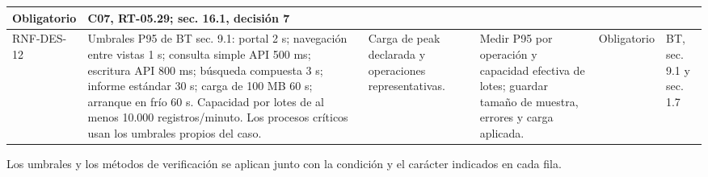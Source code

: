 \begin{longtable}{|L{0.096774\AnchoTablaAnexo}|L{0.298387\AnchoTablaAnexo}|L{0.133065\AnchoTablaAnexo}|L{0.233871\AnchoTablaAnexo}|L{0.076613\AnchoTablaAnexo}|L{0.161290\AnchoTablaAnexo}|}
Obligatorio &
C07, RT-05.29; sec. 16.1, decisión 7 \\ \hline
RNF-DES-12 &
Umbrales P95 de BT sec. 9.1: portal 2 s; navegación entre vistas 1 s; consulta simple API 500 ms; escritura API 800 ms; búsqueda compuesta 3 s; informe estándar 30 s; carga de 100 MB 60 s; arranque en frío 60 s. Capacidad por lotes de al menos 10.000 registros/minuto. Los procesos críticos usan los umbrales propios del caso. &
Carga de peak declarada y operaciones representativas. &
Medir P95 por operación y capacidad efectiva de lotes; guardar tamaño de muestra, errores y carga aplicada. &
Obligatorio &
BT, sec. 9.1 y sec. 1.7 \\ \hline
\end{longtable}

Los umbrales y los métodos de verificación se aplican junto con la condición y el carácter indicados en cada fila.

